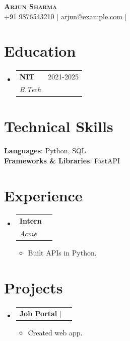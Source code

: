 \documentclass[letterpaper,10pt]{article}
\makeatletter
\newcommand{\resumeItem}[1]{
  \item\small{
    {#1 \vspace{-2pt}}
  }
}
\newcommand{\resumeSubheading}[4]{
  \vspace{-2pt}\item
    \begin{tabular*}{0.97\textwidth}[t]{l@{\extracolsep{\fill}}r}
      \textbf{#1} & #2 \\
      \textit{\small#3} & \textit{\small #4} \\
    \end{tabular*}\vspace{-7pt}
}
\newcommand{\resumeProjectHeading}[2]{
    \item
    \begin{tabular*}{0.97\textwidth}{l@{\extracolsep{\fill}}r}
      \small#1 & #2 \\
    \end{tabular*}\vspace{-7pt}
}
\newcommand{\resumeSubHeadingListStart}{\begin{itemize}[leftmargin=0.15in, label={}]}
\newcommand{\resumeSubHeadingListEnd}{\end{itemize}}
\newcommand{\resumeItemListStart}{\begin{itemize}}
\newcommand{\resumeItemListEnd}{\end{itemize}\vspace{-5pt}}
\makeatother
\begin{document}
\begin{center}
    \textbf{\Huge \scshape Arjun Sharma} \\ \vspace{2pt}
    \small 
    +91 9876543210 $|$     \href{mailto:arjun@example.com}{\underline{arjun@example.com}} $|$             \end{center}


\section{Education}
  \resumeSubHeadingListStart
          \resumeSubheading
        {NIT}{2021-2025}
        {B.Tech}{}
      \resumeSubHeadingListEnd

\section{Technical Skills}
 \begin{itemize}[leftmargin=0.15in, label={}]
    \small{\item{
                        \textbf{Languages}: Python, SQL \\
                                \textbf{Frameworks & Libraries}: FastAPI \\
                  }}
 \end{itemize}

\section{Experience}
  \resumeSubHeadingListStart
          \resumeSubheading
        {Intern}{}
        {Acme}{}
        \resumeItemListStart
                      \resumeItem{Built APIs in Python.}
                  \resumeItemListEnd
      \resumeSubHeadingListEnd

\section{Projects}
    \resumeSubHeadingListStart
              \resumeProjectHeading
          {\textbf{Job Portal} $|$ \emph{}}{}
          \resumeItemListStart
                          \resumeItem{Created web app.}
                      \resumeItemListEnd
          \resumeSubHeadingListEnd

\end{document}
